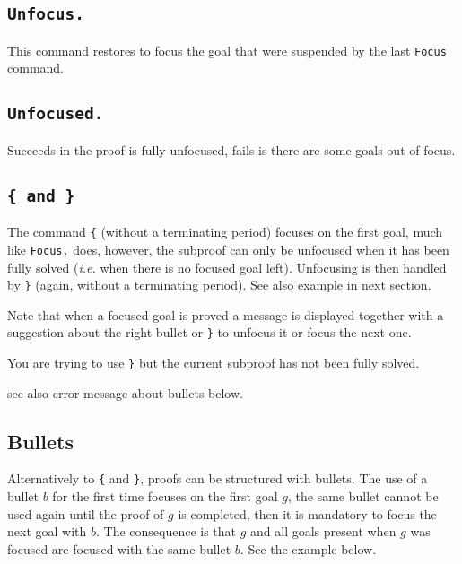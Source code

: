 
\subsection[\tt Unfocus.]{\tt Unfocus.}
This command restores to focus the goal that were suspended by the
last {\tt Focus} command.

\subsection[\tt Unfocused.]{\tt Unfocused.}
Succeeds in the proof is fully unfocused, fails is there are some
goals out of focus.

\subsection[\tt \{ \textrm{and} \}]{\tt \{ \textrm{and} \}\comindex{\{}\comindex{\}}}
The command {\tt \{} (without a terminating period) focuses on the
first goal, much like {\tt Focus.} does, however, the subproof can
only be unfocused when it has been fully solved (\emph{i.e.} when
there is no focused goal left). Unfocusing is then handled by {\tt \}}
(again, without a terminating period). See also example in next section.

Note that when a focused goal is proved a message is displayed
together with a suggestion about the right bullet or {\tt \}} to
unfocus it or focus the next one.

\begin{ErrMsgs}
\item {} You are trying to use {\tt \}} but the current subproof
  has not been fully solved.
\item see also error message about bullets below.
\end{ErrMsgs}

\subsection[Bullets]{Bullets
  }
Alternatively to {\tt \{} and {\tt \}}, proofs can be structured with
bullets. The use of a bullet $b$ for the first time focuses on the
first goal $g$, the same bullet cannot be used again until the proof
of $g$ is completed, then it is mandatory to focus the next goal with $b$. The
consequence is that $g$ and all goals present when $g$ was focused are
focused with the same bullet $b$. See the example below.

